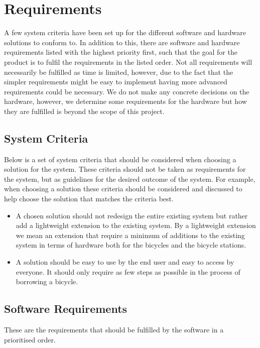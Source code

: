 \section{Requirements}
A few system criteria have been set up for the different software and hardware solutions to conform to. 
In addition to this, there are software and hardware requirements listed with the highest priority first, such that the goal for the product is to fulfil the requirements in the listed order. 
Not all requirements will necessarily be fulfilled as time is limited, however, due to the fact that the simpler requirements might be easy to implement having more advanced requirements could be necessary.
We do not make any concrete decisions on the hardware, however, we determine some requirements for the hardware but how they are fulfilled is beyond the scope of this project.

\subsection{System Criteria}
Below is a set of system criteria that should be considered when choosing a solution for the system.
These criteria should not be taken as requirements for the system, but as guidelines for the desired outcome of the system.
For example, when choosing a solution these criteria should be considered and discussed to help choose the solution that matches the criteria best.

\begin{itemize}
	\item A chosen solution should not redesign the entire existing system but rather add a lightweight extension to the existing system. 
	By a lightweight extension we mean an extension that require a minimum of additions to the existing system in terms of hardware both for the bicycles and the bicycle stations.
	\item A solution should be easy to use by the end user and easy to access by everyone. 
	It should only require as few steps as possible in the process of borrowing a bicycle.
\end{itemize}

\subsection{Software Requirements}
These are the requirements that should be fulfilled by the software in a prioritised order.

